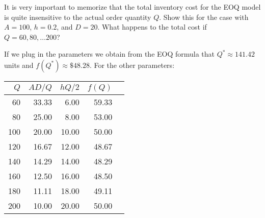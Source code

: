 \begin{comment}
\begin{exercise} \nvf{This idea is actually wrong. What if inventory is $Q^3$. We have to remove this.}
All the figures suggest that the optimal order quantity is such an order quantity where the ordering and inventory costs per unit time are the same. Is it always the case?


\begin{solution}
Yes. A formal proof can also be provided, but the intuition behind it is more important and it is rather simple. Because average procurement cost per unit time is constant, the cost trade-off lies in ordering and inventory costs per unit time. It is easy to see that the average ordering cost is decreasing in $Q$ and the average holding cost is increasing in $Q$ (see formulas and figures). Therefore, it is always better to choose a $Q$ such that these cost are balanced.
\end{solution}
\end{exercise}
\end{comment}

\begin{exercise}
  It is very important to memorize that the total inventory cost for
  the EOQ model is quite insensitive to the actual order quantity
  $Q$. Show this for the case with $A=100$, $h=0.2$, and $D=20$. What
  happens to the total cost if $Q=60, 80, \ldots 200$?
  \begin{solution}
If we plug in the parameters we obtain from the EOQ formula that $Q^{*} \approx 141.42$ units and $f(Q^{*}) \approx \mathdollar 48.28$. For the other parameters:
\begin{center}
\footnotesize
\begin{tabular}{rrrrr}
\toprule
$Q$     & $AD/Q$  &  $hQ/2$  & $f(Q)$ \\
\midrule
    60    & 33.33 &  6.00  & 59.33 \\
    80    & 25.00 &  8.00  & 53.00 \\
    100   & 20.00 &  10.00 & 50.00 \\
    120   & 16.67 &  12.00 & 48.67 \\
    140   & 14.29 &  14.00 & 48.29 \\
    160   & 12.50 &  16.00 & 48.50 \\
    180   & 11.11 &  18.00 & 49.11 \\
    200   & 10.00 &  20.00 & 50.00 \\
\bottomrule
\end{tabular}
\end{center}
  \end{solution}
\end{exercise}



